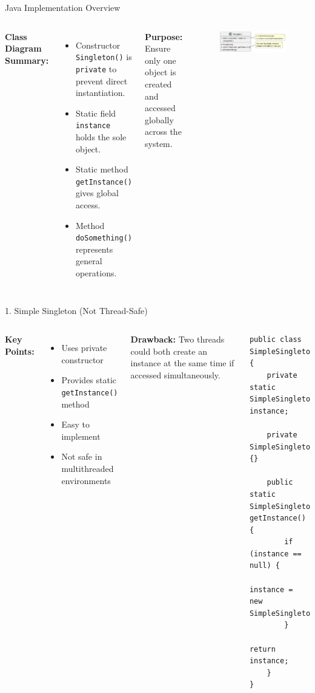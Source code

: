 \documentclass[aspectratio=169, table]{beamer}
\begin{document}
\begin{frame}[fragile]{Java Implementation Overview}
\vspace{10pt}
\begin{columns}[T]
\textbf{Class Diagram Summary:}
\begin{itemize}
\item Constructor \texttt{Singleton()} is \texttt{private} to prevent direct instantiation.
\item Static field \texttt{instance} holds the sole object.
\item Static method \texttt{getInstance()} gives global access.
\item Method \texttt{doSomething()} represents general operations.
\end{itemize}

\vspace{10pt}
\textbf{Purpose:} Ensure only one object is created and accessed globally across the system.

\begin{figure}[h]
\centering
\includegraphics[width=\linewidth]{../../figures/out/singleton.png}
\end{figure}
\end{columns}
\end{frame}

\begin{frame}[fragile]{1. Simple Singleton (Not Thread-Safe)}
\vspace{5pt}
\begin{columns}[T]
\textbf{Key Points:}
\begin{itemize}
\item Uses private constructor
\item Provides static \texttt{getInstance()} method
\item Easy to implement
\item Not safe in multithreaded environments
\end{itemize}

\textbf{Drawback:}
Two threads could both create an instance at the same time if accessed simultaneously.

\begin{lstlisting}[style=JavaStyle]
public class SimpleSingleton {
	private static SimpleSingleton instance;
	
	private SimpleSingleton() {}
	
	public static SimpleSingleton getInstance() {
		if (instance == null) {
			instance = new SimpleSingleton();
		}
		return instance;
	}
}
\end{lstlisting}
\end{columns}
\end{frame}
\end{document}
